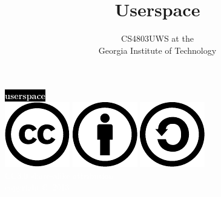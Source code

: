 \documentclass[mathserif,xcolor={dvipsnames,table}]{beamer}
\title{\textbf{Userspace}}
\date{}
\author{CS4803UWS at the\\
Georgia Institute of Technology
}
\begin{document}
{
%
\begin{frame}[plain]
\textcolor{white}{
%
\colorbox{black}{\textbf{userspace}}
}
\vspace{2.7in}
\\
\hfill\includegraphics[scale=.25]{images/cc-logo.pdf}
\includegraphics[scale=.25]{images/cc-new.pdf}
\includegraphics[scale=.25]{images/cc-share.pdf}
\textcolor{white}{
\\
\hfill \tiny{CC3.0 share-alike attribution}\\
}
\textcolor{white}{
\hfill \scriptsize{copyright \copyright\ 2013}\\
}
\end{frame}
}
\end{document}
